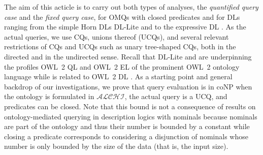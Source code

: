 \documentclass{lmcs}
\theoremstyle{definition}
\begin{document}
The aim of this acticle is to carry out both types of analyses, the
\emph{quantified query case} and the \emph{fixed query case}, for OMQs
with closed predicates and for DLs ranging from the simple Horn DLs
DL-Lite and \EL to the expressive DL \alchi.  As the actual queries,
we use CQs, unions thereof (UCQs), and several relevant restrictions
of CQs and UCQs such as unary tree-shaped CQs, both in the directed
and in the undirected sense. Recall that DL-Lite and \EL are
underpinning the profiles OWL~2 QL and OWL~2 EL of the prominent OWL~2
ontology language while \alchi is related to OWL~2 DL
\cite{CDLLR07,DBLP:journals/jair/ArtaleCKZ09,BaBrLu-IJCAI-05}.  As a
starting point and general backdrop of our investigations, we prove
that query evaluation is in {\sc coNP} when the ontology is formulated
in $\mathcal{ALCHI}$, the actual query is a UCQ, and predicates can be
closed. Note that this bound is not a consequence of results on
ontology-mediated querying in description logics with nominals
\cite{ortiz2008data} because nominals are part of the ontology and
thus their number is bounded by a constant while closing a predicate
corresponds to considering a disjunction of nominals whose number is
only bounded by the size of the data (that is, the input size).
\end{document}
